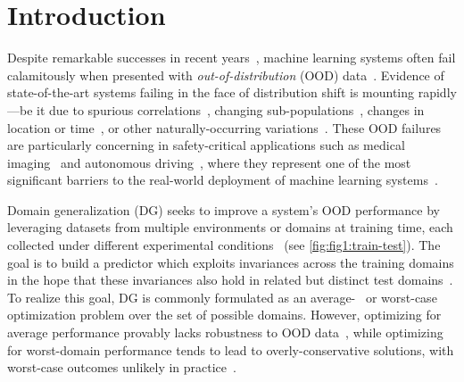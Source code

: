 \documentclass{article}
\begin{document}
\section{Introduction}\vspace{-1mm}
\label{sec:intro}
%
Despite remarkable successes in recent years~\citep{lecun2015deep, silver2016mastering, jumper2021highly}, machine learning systems often fail calamitously when presented with \textit{out-of-distribution} (OOD) data~\citep{torralba2011unbiased, beery2018recognition, hendrycks2019benchmarking, geirhos2020shorcut}. 
%
Evidence of state-of-the-art systems failing in the face of distribution shift is mounting rapidly---be it due to spurious correlations~\citep{zech2018variable, arjovsky2020invariant, niven2020probing}, changing sub-populations~\citep{santurkar2020breeds, wilds2021, borkan2019nuanced}, changes in location or time~\citep{hansen2013high, christie2018functional, shankar2021image}, or other naturally-occurring variations~\citep{karahan2016image, azulay2019deep, eastwood2021source, hendrycks2021natural, hendrycks2021many,robey2021modelbased,zhou2022deep}. These OOD failures are particularly concerning in safety-critical applications such as medical imaging~\citep{jovicich2009mri, albadawy2018deep, tellez2019quantifying, beede2020, wachinger2021detect} and autonomous driving~\citep{dai2018dark, volk2019towards, michaelis2019dragon}, where they represent one of the most significant barriers to the real-world deployment of machine learning systems~\citep{ribeiro2016should, biggio2018wild, maartensson2020reliability, castro2020causality}.

%
%
Domain generalization (DG) seeks to improve a system's
%
%
OOD performance by leveraging datasets from multiple
environments or domains at training time, each collected under different experimental conditions~\citep{blanchard2011generalizing, muandet2013domain, gulrajani2020search} (see \cref{fig:fig1:train-test}). 
%
The goal is to build a predictor which exploits invariances across the training domains in the hope that these invariances also hold in related but distinct test domains~\citep{gulrajani2020search, schoelkopf2012causal, li2018learning, krueger21rex}. 
%
 To realize this goal, DG is commonly formulated as an average-~\citep{blanchard2011generalizing,blanchard2021domain,zhang2020adaptive} or worst-case~~\citep{ben2009robust, sagawa2019distributionally, arjovsky2020invariant} optimization problem
%
%
%
over the set of possible domains.
%
However, optimizing for average performance provably lacks robustness to OOD data~\cite{nagarajan2021understanding}, while optimizing for worst-domain performance
%
%
%
%
tends to lead to overly-conservative solutions, with worst-case outcomes unlikely in practice~\citep{tsipras2019robustness, raghunathan2019adversarial}.
%
%
%
%
%
%
%
%
%
\end{document}
